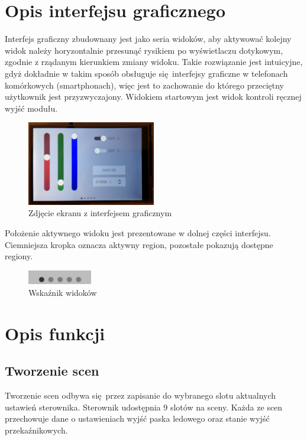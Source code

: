\documentclass[12pt, eng, twoside, openany, final]{mgr}
\begin{document}
    \section{Opis interfejsu graficznego}
    Interfejs graficzny zbudownany jest jako seria widoków, aby aktywować kolejny widok należy horyzontalnie przesunąć rysikiem po wyświetlaczu dotykowym, zgodnie z rządanym kierunkiem zmiany widoku. Takie rozwiązanie jest intuicyjne, gdyż dokładnie w takim sposób obsługuje się interfejsy graficzne w telefonach komórkowych (smartphonach), więc jest to zachowanie do którego przeciętny użytkownik jest przyzwyczajony.
    Widokiem startowym jest widok kontroli ręcznej wyjść modułu.
        \begin{figure}[H]
        \begin{center}
            \includegraphics[width=0.5\textwidth]{ui_live.jpg}
            \caption{Zdjęcie ekranu z interfejsem graficznym}
        \end{center}
        \end{figure}
    
    Położenie aktywnego widoku jest prezentowane w dolnej części interfejsu. Ciemniejsza kropka oznacza aktywny region, pozostałe pokazują dostępne regiony.
        \begin{figure}[H]
        \begin{center}
            \includegraphics[width=0.25\textwidth]{ui_pageind.jpg}
            \caption{Wskaźnik widoków}
        \end{center}
        \end{figure}
    \newpage
    
    \section{Opis funkcji}
        \subsection{Tworzenie scen}
        Tworzenie scen odbywa się przez zapisanie do wybranego slotu aktualnych ustawień sterownika. Sterownik udostępnia 9 slotów na sceny.
        Każda ze scen przechowuje dane o ustawieniach wyjść paska ledowego oraz stanie wyjść przekaźnikowych. 
\end{document}
